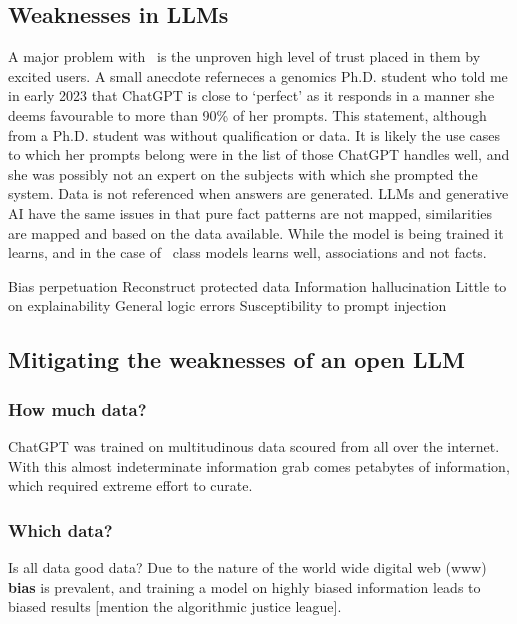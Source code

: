 \subsection{Weaknesses in LLMs}
A major problem with \llms\ is the unproven high level of trust placed in them by excited users.
A small anecdote referneces a genomics Ph.D. student who told me in early 2023 that ChatGPT is close to `perfect' as it responds in a manner she deems favourable to more than 90\% of her prompts.
This statement, although from a Ph.D. student was without qualification or data.
It is likely the use cases to which her prompts belong were in the list of those ChatGPT handles well, and she was possibly not an expert on the subjects with which she prompted the system.
Data is not referenced when answers are generated.
LLMs and generative AI have the same issues in that pure fact patterns are not mapped, similarities are mapped and based on the data available.
While the model is being trained it learns, and in the case of \gpts\ class models learns well, associations and not facts.

Bias perpetuation
Reconstruct protected data
Information hallucination
Little to on explainability
General logic errors
Susceptibility to prompt injection

\subsection{Mitigating the weaknesses of an open LLM}
\subsubsection{How much data?}
ChatGPT was trained on multitudinous data scoured from all over the internet. 
With this almost indeterminate information grab comes petabytes of information, which required extreme effort to curate.
\subsubsection{Which data?}
Is all data good data?
Due to the nature of the world wide digital web (www) \textbf{bias} is prevalent, and training a model on highly biased information leads to biased results [mention the algorithmic justice league].
